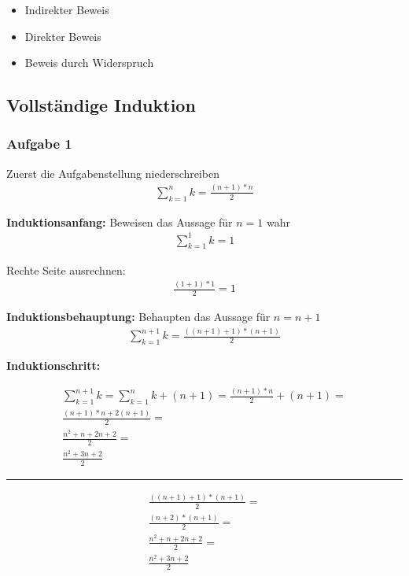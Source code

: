 \documentclass{article}
\begin{document}
\begin{multicols}{2}
\begin{itemize}
    \item Indirekter Beweis
    \item Direkter Beweis
    \item Beweis durch Widerspruch
\end{itemize}



\subsection{Vollständige Induktion}


\subsubsection{Aufgabe 1}

\noindent Zuerst die Aufgabenstellung niederschreiben
\begin{align*}
    \sum_{k=1}^{n}k = \frac{(n + 1) * n}{2}
\end{align*}


\noindent \textbf{Induktionsanfang:} Beweisen das Aussage für $ n  = 1 $ wahr 
\begin{align*}
    \sum_{k=1}^{1}k = 1
\end{align*}

\noindent Rechte Seite ausrechnen:
\begin{align*}
    \frac{(1 + 1) * 1}{2} = 1
\end{align*}


\noindent \textbf{Induktionsbehauptung:} Behaupten das Aussage für $ n = n + 1 $
\begin{align*}
    \sum_{k=1}^{n + 1}k = \frac{((n + 1) + 1) * (n + 1)}{2}
\end{align*}

\noindent \textbf{Induktionschritt:}

\begin{align*}
    \sum_{k=1}^{n + 1}k  = \sum_{k=1}^{n}k + (n + 1) = \frac{(n + 1) * n}{2} +  (n + 1) = \\
    \frac{(n + 1) * n + 2(n + 1)}{2} = \\
    \frac{n^2 + n + 2n + 2}{2} = \\
    \frac{n^2 + 3n + 2}{2}
\end{align*}
\hrule
\begin{align*}
    \frac{((n + 1) + 1) * (n + 1)}{2} = \\
    \frac{(n + 2) * (n + 1)}{2} = \\
    \frac{n^2 + n +2n + 2}{2} = \\
    \frac{n^2 + 3n + 2}{2}
\end{align*}


\end{multicols}
\end{document}
